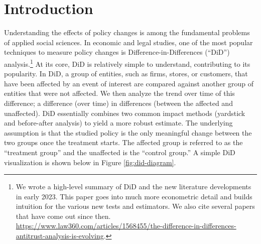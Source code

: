\documentclass[12pt]{article}
\begin{document}
\doublespacing

\newpage
\section{Introduction} \label{sec:introduction}
Understanding the effects of policy changes is among the fundamental problems of applied social sciences. In economic and legal studies, one of the most popular techniques to measure policy changes is Difference-in-Differences (“DiD”) analysis.\footnote{We wrote a high-level summary of DiD and the new literature developments in early 2023. This paper goes into much more econometric detail and builds intuition for the various new tests and estimators. We also cite several papers that have come out since then. \url{https://www.law360.com/articles/1568455/the-difference-in-differences-antitrust-analysis-is-evolving}.}  At its core, DiD is relatively simple to understand, contributing to its popularity. In DiD, a group of entities, such as firms, stores, or customers, that have been affected by an event of interest are compared against another group of entities that were not affected. We then analyze the trend over time of this difference; a difference (over time) in differences (between the affected and unaffected). DiD essentially combines two common impact methods (yardstick and before-after analysis) to yield a more robust estimate. The underlying assumption is that the studied policy is the only meaningful change between the two groups once the treatment starts. The affected group is referred to as the “treatment group” and the unaffected is the “control group.” A simple DiD visualization is shown below in Figure \ref{fig:did-diagram}.
\end{document}
